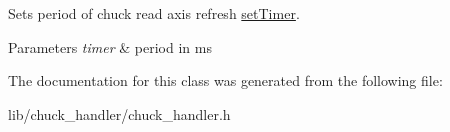 Sets period of chuck read axis refresh  \hyperlink{classsetTimer}{set\+Timer}. 


\begin{DoxyParams}{Parameters}
{\em timer} & period in ms \\
\hline
\end{DoxyParams}


The documentation for this class was generated from the following file\+:\begin{DoxyCompactItemize}
\item 
lib/chuck\+\_\+handler/chuck\+\_\+handler.\+h\end{DoxyCompactItemize}
